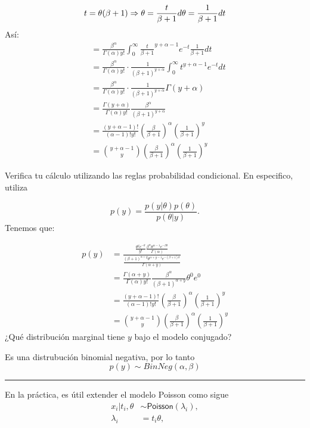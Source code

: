\documentclass[
]{article}
\begin{document}
\[
t = \theta(\beta +1)\\
\Rightarrow \theta = \frac{t}{\beta +1} \\
d\theta = \frac{1}{\beta +1}dt
\] Así: \[
\begin{align}
&= \frac{\beta^\alpha}{\Gamma(\alpha)y!} 
\int_0^\infty\frac{t}{\beta +1}^{y+\alpha -1}e^{-t} \frac{1}{\beta +1}dt \\
&= \frac{\beta^\alpha}{\Gamma(\alpha)y!}\cdot\frac{1}{(\beta+1)^{y+\alpha}} \int_0^\infty t^{y+\alpha -1}e^{-t}dt \\
&= \frac{\beta^\alpha}{\Gamma(\alpha)y!}\cdot\frac{1}{(\beta+1)^{y+\alpha}} \Gamma(y+\alpha) \\
&= \frac{\Gamma(y+\alpha)}{\Gamma(\alpha)y!}  \frac{\beta^\alpha}{(\beta+1)^{y+\alpha}} \\
&=\frac{(y+\alpha-1)!}{(\alpha-1)!y!} \left(\frac{\beta}{\beta+1}\right)^\alpha \left(\frac{1}{\beta+1}\right)^y \\
&=\binom{y+\alpha-1}{y} \left(\frac{\beta}{\beta+1}\right)^\alpha \left(\frac{1}{\beta+1}\right)^y
\end{align}
\]

Verifica tu cálculo utilizando las reglas probabilidad condicional. En
especifico, utiliza

\[ p(y) = \frac{p(y|\theta)p(\theta)}{p(\theta|y)}.\] Tenemos que:

\[
\begin{align}
p(y) &= \frac{ \frac{\theta^y e^{-\theta}}{y!} \frac{\beta^\alpha\theta^{\alpha-1}e^{-\beta\theta}}{\Gamma(\alpha)}}
{\frac{(\beta+1)^{\alpha+y}\theta^{\alpha+y-1}e^{-(\beta+1)\theta}}{\Gamma(\alpha+y)}} \\
&= \frac{\Gamma(\alpha+y)}{\Gamma(\alpha)y!} \frac{\beta^\alpha}{(\beta+1)^{\alpha + y}}\theta^0e^0 \\
&=\frac{(y+\alpha-1)!}{(\alpha-1)!y!} \left(\frac{\beta}{\beta+1}\right)^\alpha \left(\frac{1}{\beta+1}\right)^y \\
&=\binom{y+\alpha-1}{y} \left(\frac{\beta}{\beta+1}\right)^\alpha \left(\frac{1}{\beta+1}\right)^y
\end{align}
\] ¿Qué distribución marginal tiene \(y\) bajo el modelo conjugado?

Es una distrubución binomial negativa, por lo tanto
\[ p(y) \sim BinNeg(\alpha,\beta)\]

\begin{center}\rule{0.5\linewidth}{0.5pt}\end{center}

En la práctica, es útil extender el modelo Poisson como sigue
\begin{align}
  x_i | t_i, \theta &\sim \textsf{Poisson}(\lambda_i), \\
  \lambda_i &= t_i \theta, 
\end{align}
\end{document}
